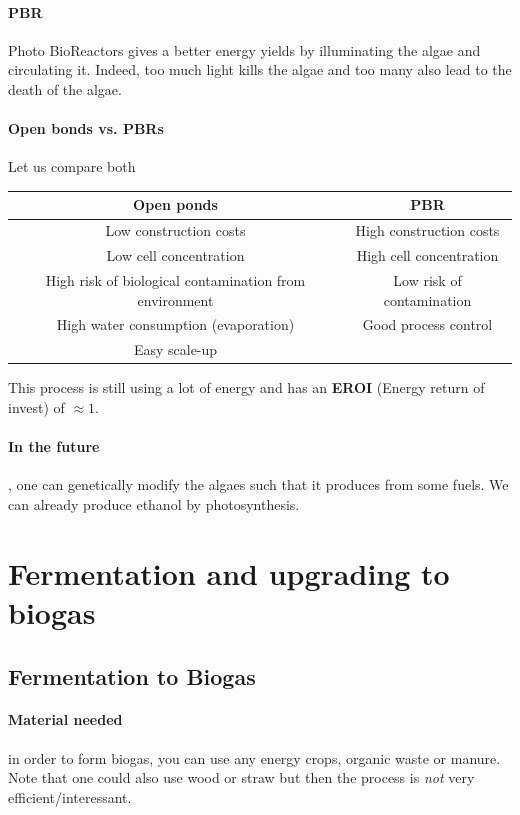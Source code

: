 \documentclass[10pt,a4paper]{article}
\begin{document}
 \paragraph{PBR}Photo BioReactors gives a better energy yields by illuminating the algae and circulating it. Indeed, too much light kills the algae and too many also lead to the death of the algae.
 
 \paragraph{Open bonds vs. PBRs} Let us compare both
 \begin{table}[h!]
 \centering
 \begin{tabular}{c|c}
 \textbf{Open ponds} & \textbf{PBR} \\ \hline
 {\color{green}Low} construction costs & {\color{red}High} construction costs \\
 {\color{red}Low} cell concentration & {\color{green}High} cell concentration \\
  {\color{red}High} risk of biological contamination from environment & {\color{green}Low} risk of contamination\\
   {\color{red}High} water consumption (evaporation) & {\color{green}Good} process control \\
  {\color{green}Easy} scale-up & \\
 \end{tabular}
 \end{table}

This process is still using a lot of energy and has an \textbf{EROI} (Energy return of invest) of $\approx 1$.

\paragraph{In the future}, one can genetically modify the algaes such that it produces from  some fuels. We can already produce ethanol by photosynthesis. 
 
\section{Fermentation and upgrading to biogas}
 \subsection{Fermentation to Biogas}
 \paragraph{Material needed}in order to form biogas, you can use any energy crops, organic waste or manure. Note that one could also use wood or straw but then the process is \emph{not} very efficient/interessant.
 
\end{document}
